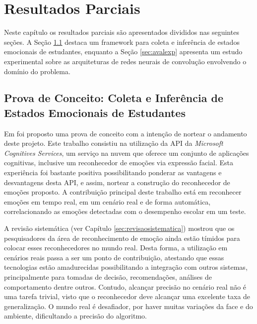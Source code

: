 \chapter{Resultados Parciais}\label{sec:resultados}
Neste capítulo os resultados parciais são apresentados divididos nas seguintes seções. A Seção \ref{sec:prova} destaca um framework para coleta e inferência de estados emocionais de estudantes, enquanto a Seção \ref{sec:avalexp} apresenta um estudo experimental sobre as arquiteturas de redes neurais de convolução envolvendo o domínio do problema.   


\section{Prova de Conceito: Coleta e Inferência de Estados Emocionais de Estudantes}\label{sec:prova}
Em \citep{cruz2017framework} foi proposto uma prova de conceito com a intenção de nortear o andamento deste projeto. Este trabalho consistiu na utilização da API da \textit{Microsoft Cognitives Services}, um serviço na nuvem que oferece um conjunto de aplicações cognitivas, inclusive um reconhecedor de emoções via expressão facial. Esta experiência foi bastante positiva possibilitando ponderar as vantagens e desvantagens desta API, e assim, nortear a construção do reconhecedor de emoções proposto. A contribuição principal deste trabalho está em reconhecer emoções em tempo real, em um cenário real e de forma automática, correlacionando as emoções detectadas com o desempenho escolar em um teste. 

A revisão sistemática (ver Capítulo \ref{sec:revisaosistematica}) mostrou que os pesquisadores da área de reconhecimento de emoção ainda estão tímidos para colocar esses reconhecedores no mundo real. Desta forma, a utilização em cenários reais passa a ser um ponto de contribuição, atestando que essas tecnologias estão amadurecidas possibilitando a integração com outros sistemas, principalmente para tomadas de decisão, recomendações, análises de comportamento dentre outros. Contudo, alcançar precisão no cenário real não é uma tarefa trivial, visto que o reconhecedor deve alcançar uma excelente taxa de generalização. O mundo real é desafiador, por haver muitas variações da face e do ambiente, dificultando a precisão do algoritmo.  

